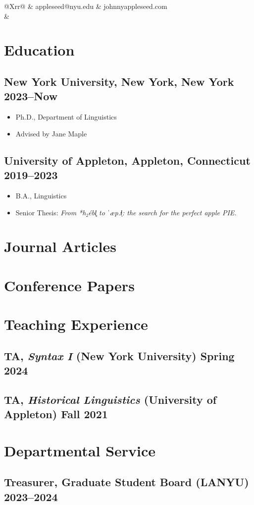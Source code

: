 \documentclass{article}
\begin{document}
\begin{tabularx}{\textwidth}{@{}Xrr@{}}
	 & appleseed@nyu.edu                                      & johnnyappleseed.com \\
	                                                  & 
\end{tabularx}

\section*{Education}

\subsection*{\textbf{New York University}, New York, New York \hfill 2023--Now}
\begin{itemize}
	\item Ph.D., Department of Linguistics
	\item Advised by Jane Maple
\end{itemize}

\subsection*{\textbf{University of Appleton}, Appleton, Connecticut \hfill 2019--2023}
\begin{itemize}
	\item B.A., Linguistics
	\item Senior Thesis: \emph{From {*h₂ébl̥} to {ˈæp.ɫ̩}: the search for the perfect apple PIE.}
\end{itemize}

\section*{Journal Articles}
\printbibliography[heading=none, type=article]

\section*{Conference Papers}
\printbibliography[heading=none, type=inproceedings]

\section*{Teaching Experience}
\subsection*{TA, \emph{Syntax I} (New York University) \hfill Spring 2024}
\subsection*{TA, \emph{Historical Linguistics} (University of Appleton) \hfill Fall 2021}

\section*{Departmental Service}
\subsection*{Treasurer, Graduate Student Board (LANYU) \hfill 2023--2024}
\end{document}
